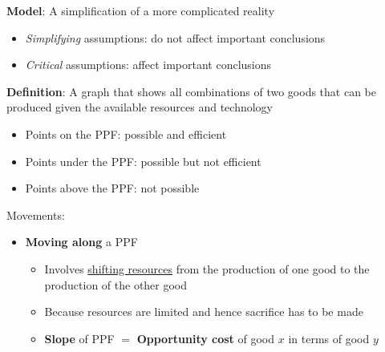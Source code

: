 \documentclass{article}
\begin{document}
\begin{multicols}{2}
\textbf{Model}: A simplification of a more complicated reality
\begin{itemize}
	\item \textit{Simplifying} assumptions: do not affect important conclusions
	\item \textit{Critical} assumptions: affect important conclusions
\end{itemize}
\textbf{Definition}: A graph that shows all combinations of two goods that can be produced given the available resources and technology
\begin{itemize}
	\item Points on the PPF: possible and efficient
	\item Points under the PPF: possible but not efficient
	\item Points above the PPF: not possible\\
\end{itemize}
Movements:
\begin{itemize}

	\item \textbf{Moving along} a PPF
	\begin{itemize}
		\item Involves \underline{shifting resources} from the production of one good to the production of the other good
		\item Because resources are limited and hence sacrifice has to be made
		\item \textbf{Slope} of PPF $=$ \textbf{Opportunity cost} of good $x$ in terms of good $y$


\end{itemize}
\end{itemize}
\end{multicols}
\end{document}
